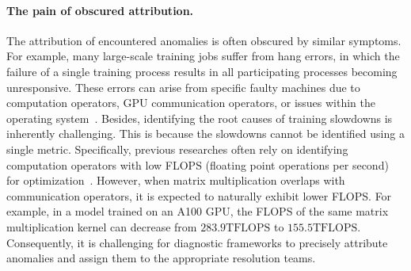 \paragraph{The pain of obscured attribution.}
The attribution of encountered anomalies is often obscured by similar symptoms. For example, many large-scale training jobs suffer from hang errors, in which the failure of a single training process results in all participating processes becoming unresponsive.
These errors can arise from specific faulty machines due to computation operators, GPU communication operators, or issues within the operating system~\cite{jiangMegaScaleScaling}.
Besides, identifying the root causes of training slowdowns is inherently challenging. This is because the slowdowns cannot be identified using a single metric.
Specifically, previous researches often rely on identifying computation operators with low FLOPS (floating point operations per second) for optimization~\cite{cutlass2024,cublas2024}. However, when matrix multiplication overlaps with communication operators, it is expected to naturally exhibit lower FLOPS.
For example, in a model trained on an A100 GPU, the FLOPS of the same matrix multiplication kernel can decrease from $283.9\text{TFLOPS}$ to $155.5\text{TFLOPS}$.
Consequently, it is challenging for diagnostic frameworks to precisely attribute anomalies and assign them to the appropriate resolution teams. 



